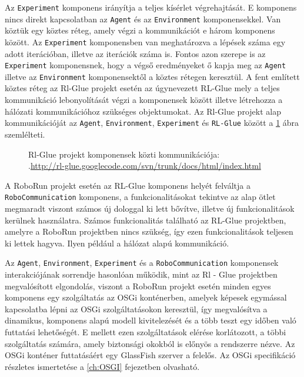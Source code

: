	Az \texttt{Experiment} komponens irányítja a teljes kísérlet végrehajtását. E komponens nincs direkt kapcsolatban az \texttt{Agent} és az \texttt{Environment} komponensekkel. Van köztük egy köztes réteg, amely végzi a kommunikációt e három komponens között.  Az \texttt{Experiment} komponensben van meghatározva a lépések száma egy adott iterációban, illetve az iterációk száma is. Fontos azon szerepe is az \texttt{Experiment} komponensnek, hogy a végső eredményeket ő kapja meg az \texttt{Agent} illetve az \texttt{Environment} komponensektől a köztes rétegen keresztül.
A fent említett köztes réteg az Rl-Glue projekt esetén az úgynevezett RL-Glue mely a teljes kommunikáció lebonyolítását végzi a komponensek között illetve létrehozza a hálózati kommunikációhoz szükséges objektumokat. Az Rl-Glue projekt alap kommunikációját az \texttt{Agent}, \texttt{Environment}, \texttt{Experiment} és \texttt{RL-Glue} között a \ref{fig:RlGlueKommunikacio} ábra szemlélteti.

\begin{figure}[h!]
  \centering
  \caption[Példa képek beszúrására]%
  {Rl-Glue projekt komponensek közti kommunikációja:\\
  {\white .}\hfill\url{http://rl-glue.googlecode.com/svn/trunk/docs/html/index.html}}
  \label{fig:RlGlueKommunikacio}
\end{figure}

A RoboRun projekt esetén az RL-Glue komponens helyét felváltja a \texttt{RoboCommunication} komponens, a funkcionalitásokat tekintve az alap ötlet megmaradt viszont számos új dologgal ki lett bővítve, illetve új funkcionalitások kerülnek használatra. Számos funkcionalitás található az RL-Glue projektben, amelyre a RoboRun projektben nincs szükség, így ezen funkcionalitások teljesen ki lettek hagyva. Ilyen például a hálózat alapú kommunikáció.

	Az \texttt{Agent}, \texttt{Environment}, \texttt{Experiment} és a \texttt{RoboCommunication}  komponensek interakciójának sorrendje hasonlóan működik, mint az Rl - Glue projektben megvalósított elgondolás, viszont a RoboRun projekt esetén minden egyes komponens  egy szolgáltatás az OSGi konténerben, amelyek képesek egymással kapcsolatba lépni az OSGi szolgáltatásokon keresztül, így megvalósítva a dinamikus, komponens alapú modell kivitelezését és a több teszt egy időben való futtatási lehetőségét. E mellett ezen szolgáltatások elérése korlátozott, a többi szolgáltatás számára, amely biztonsági okokból is előnyös a rendszerre nézve. Az OSGi konténer futtatásáért egy GlassFish\citep{glassfish} szerver a felelős. Az OSGi specifikáció részletes ismertetése a \ref{ch:OSGI} fejezetben olvasható.
	
